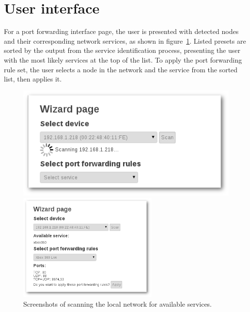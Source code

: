 \documentclass[a4paper,11pt,makeidx]{kth-bcs}
\begin{document}
   \section{User interface}
For a port forwarding interface page, the user is presented with detected nodes and their corresponding network services, as shown in figure~\ref{fig:scannin}.
Listed presets are sorted by the output from the service identification process, presenting the user with the most likely services at the top of the list.
To apply the port forwarding rule set, the user selects a node in the network and the service from the sorted list, then applies it.


\begin{figure}[h]
   \begin{minipage}[b]{0.45\linewidth}
      \centering
      \includegraphics[width=\textwidth]{ss-scanning-shadow}
   \end{minipage}
   \hspace{0.5cm}
   \begin{minipage}[b]{0.45\linewidth}
      \centering
      \includegraphics[width=7cm]{ss-scanned-shadow}
   \end{minipage}
   \caption{Screenshots of scanning the local network for available services.}
   \label{fig:scannin}
\end{figure}
\end{document}
